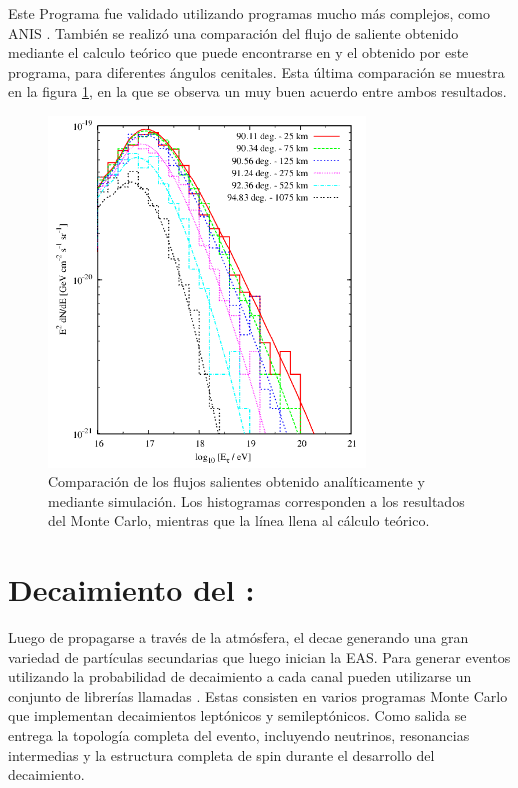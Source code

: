 	Este Programa fue validado utilizando programas mucho m\'as complejos, como ANIS \cite{anis}.
	Tambi\'en se realiz\'o una comparaci\'on del flujo de \tauon{} saliente obtenido mediante el calculo te\'orico que puede encontrarse en \cite{prop_tau} y el obtenido por este programa, para diferentes \'angulos cenitales.
	Esta \'ultima comparaci\'on se muestra en la figura \ref{fig:comp_tau_mc_teo}, en la que se observa un muy buen acuerdo entre ambos resultados.
	\begin{figure}[h!]
		\begin{center}
		\includegraphics[width=0.75\textwidth]{fig/simulacionAuger/comp_tau_mc_teo}
		\caption{\label{fig:comp_tau_mc_teo} Comparaci\'on de los flujos salientes obtenido anal\'iticamente y mediante simulaci\'on. Los histogramas corresponden a los resultados del Monte Carlo, mientras que la l\'inea llena al c\'alculo te\'orico.}
		\end{center}
	\end{figure}
	
	\section{Decaimiento del \tauon{}: \tauola{}}
	
	Luego de propagarse a trav\'es de la atm\'osfera, el \tauon{} decae generando una gran variedad de part\'iculas secundarias que luego inician la EAS.
% 	
	Para generar eventos utilizando la probabilidad de decaimiento a cada canal pueden utilizarse un conjunto de librer\'ias llamadas \tauola{}.
	Estas consisten en varios programas Monte Carlo que implementan decaimientos lept\'onicos y semilept\'onicos.
	Como salida se entrega la topolog\'ia completa del evento, incluyendo neutrinos, resonancias intermedias y la estructura completa de spin durante el desarrollo del decaimiento.
	
